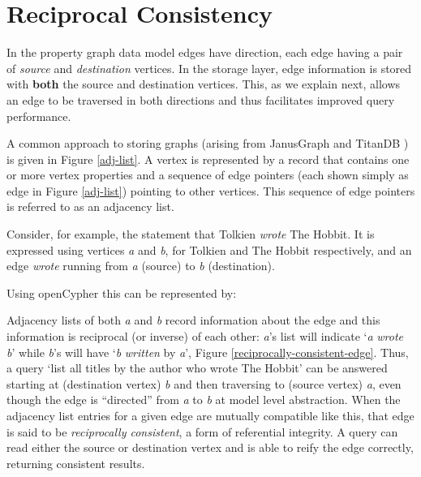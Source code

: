 \section{Reciprocal Consistency}
\label{sec:recipr-cons}

In the property graph data model edges have direction, each edge having a pair of \emph{source} and \emph{destination} vertices.
In the storage layer, edge information is stored with \textbf{both} the source and destination vertices.
This, as we explain next, allows an edge to be traversed in both directions and thus facilitates improved query performance.

A common approach to storing graphs (arising from JanusGraph \cite{janusgraph} and TitanDB \cite{TitanDB}) is given in Figure \ref{adj-list}.
A vertex is represented by a record that contains one or more vertex properties and a sequence of edge pointers (each shown simply as edge in Figure \ref{adj-list}) pointing to other vertices.
This sequence of edge pointers is referred to as an adjacency list.

Consider, for example, the statement that Tolkien \textit{wrote} The Hobbit.
It is expressed using vertices \emph{a} and \emph{b}, for Tolkien and The Hobbit respectively, and an edge \textit{wrote} running from \emph{a} (source) to \emph{b} (destination).

Using openCypher \cite{openCypher} this can be represented by:


Adjacency lists of both \emph{a} and \emph{b} record information about the edge and this information is reciprocal (or inverse) of each other: \emph{a}'s list will indicate `\emph{a} \emph{wrote} \emph{b}' while \emph{b}'s will have `\emph{b} \emph{written} by \emph{a}', Figure \ref{reciprocally-consistent-edge}. Thus, a query `list all titles by the author who wrote The Hobbit' can be answered starting at (destination vertex) \emph{b} and then traversing to (source vertex) \emph{a}, even though the edge is ``directed'' from \emph{a} to \emph{b} at model level abstraction. When the adjacency list entries for a given edge are mutually compatible like this, that edge is said to be \emph{reciprocally consistent}, a form of referential integrity. A query can read either the source or destination vertex and is able to reify the edge correctly, returning consistent results.

